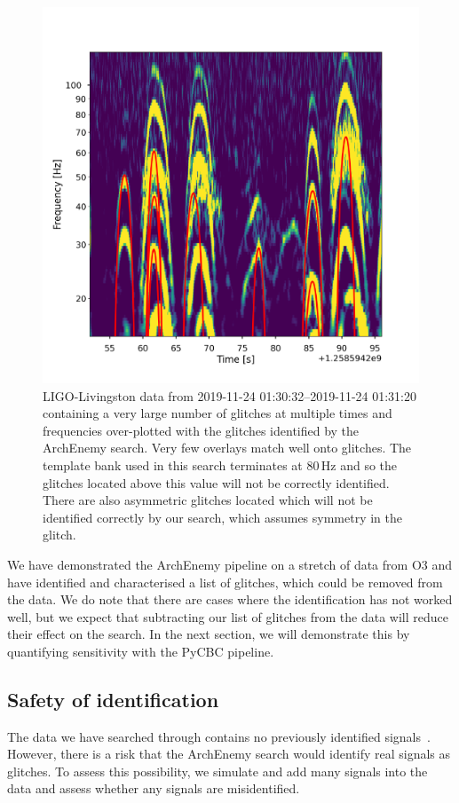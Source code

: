 \begin{figure}
       \centering
    \includegraphics[width=0.7\linewidth]{images/4_archenemy/Section3/3.7/overlay_bad_overlays.pdf}
    \caption{LIGO-Livingston data from 2019-11-24 01:30:32--2019-11-24 01:31:20 containing a very large number of \scladj glitches at multiple times and frequencies over-plotted with the \scladj glitches identified by the ArchEnemy search. Very few overlays match well onto \scladj glitches. The template bank used in this search terminates at $80 \, \text{Hz}$ and so the \scladj glitches located above this value will not be correctly identified. There are also asymmetric \scladj glitches located which will not be identified correctly by our search, which assumes symmetry in the \scladj glitch.}
    \label{4:fig:overlay_bads}
\end{figure}

We have demonstrated the ArchEnemy pipeline on a stretch of data from O3 and have identified and characterised a list of \scladj glitches, which could be removed from the data. We do note that there are cases where the identification has not worked well, but we expect that subtracting our list of glitches from the data will reduce their effect on the \gwadj search. In the next section, we will demonstrate this by quantifying sensitivity with the PyCBC pipeline.

\subsection{Safety of \scl identification}
\label{4:ssec:injsafety}

The data we have searched through contains no previously identified \gwadj signals~\cite{gwtc3:2023}. However, there is a risk that the ArchEnemy search would identify real \gwadj signals as \scladj glitches. To assess this possibility, we simulate and add many \gwadj signals into the data and assess whether any signals are misidentified.

